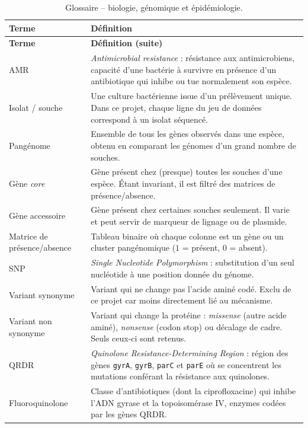 \documentclass[11pt,a4paper]{article}
\begin{document}
\begin{longtable}{@{}>{\raggedright\arraybackslash}p{3.5cm}>{\raggedright\arraybackslash}p{12cm}@{}}
\caption{Glossaire -- biologie, génomique et épidémiologie.}
\label{tab:glossaire-bio}\\
\toprule
\textbf{Terme} & \textbf{Définition} \\
\midrule
\endfirsthead
\toprule
\textbf{Terme} & \textbf{Définition (suite)} \\
\midrule
\endhead
\bottomrule
\endfoot
AMR & \emph{Antimicrobial resistance} : résistance aux antimicrobiens, capacité d'une bactérie à survivre en présence d'un antibiotique qui inhibe ou tue normalement son espèce. \\
Isolat / souche & Une culture bactérienne issue d'un prélèvement unique. Dans ce projet, chaque ligne du jeu de données correspond à un isolat séquencé. \\
Pangénome & Ensemble de tous les gènes observés dans une espèce, obtenu en comparant les génomes d'un grand nombre de souches. \\
Gène \emph{core} & Gène présent chez (presque) toutes les souches d'une espèce. Étant invariant, il est filtré des matrices de présence/absence. \\
Gène accessoire & Gène présent chez certaines souches seulement. Il varie et peut servir de marqueur de lignage ou de plasmide. \\
Matrice de présence/absence & Tableau binaire où chaque colonne est un gène ou un cluster pangénomique ($1$ = présent, $0$ = absent). \\
SNP & \emph{Single Nucleotide Polymorphism} : substitution d'un seul nucléotide à une position donnée du génome. \\
Variant synonyme & Variant qui ne change pas l'acide aminé codé. Exclu de ce projet car moins directement lié au mécanisme. \\
Variant non synonyme & Variant qui change la protéine : \emph{missense} (autre acide aminé), \emph{nonsense} (codon stop) ou décalage de cadre. Seuls ceux-ci sont retenus. \\
QRDR & \emph{Quinolone Resistance-Determining Region} : région des gènes \texttt{gyrA}, \texttt{gyrB}, \texttt{parC} et \texttt{parE} où se concentrent les mutations conférant la résistance aux quinolones. \\
Fluoroquinolone & Classe d'antibiotiques (dont la ciprofloxacine) qui inhibe l'ADN gyrase et la topoisomérase IV, enzymes codées par les gènes QRDR. \\

\end{longtable}
\end{document}
